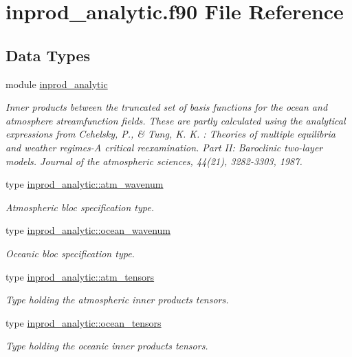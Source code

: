 \hypertarget{inprod__analytic_8f90}{\section{inprod\-\_\-analytic.\-f90 File Reference}
\label{inprod__analytic_8f90}
}
\subsection*{Data Types}
\begin{DoxyCompactItemize}
\item 
module \hyperlink{classinprod__analytic}{inprod\-\_\-analytic}
\begin{DoxyCompactList}\small\item\em Inner products between the truncated set of basis functions for the ocean and atmosphere streamfunction fields. These are partly calculated using the analytical expressions from Cehelsky, P., \& Tung, K. K. \-: Theories of multiple equilibria and weather regimes-\/\-A critical reexamination. Part I\-I\-: Baroclinic two-\/layer models. Journal of the atmospheric sciences, 44(21), 3282-\/3303, 1987. \end{DoxyCompactList}\item 
type \hyperlink{structinprod__analytic_1_1atm__wavenum}{inprod\-\_\-analytic\-::atm\-\_\-wavenum}
\begin{DoxyCompactList}\small\item\em Atmospheric bloc specification type. \end{DoxyCompactList}\item 
type \hyperlink{structinprod__analytic_1_1ocean__wavenum}{inprod\-\_\-analytic\-::ocean\-\_\-wavenum}
\begin{DoxyCompactList}\small\item\em Oceanic bloc specification type. \end{DoxyCompactList}\item 
type \hyperlink{structinprod__analytic_1_1atm__tensors}{inprod\-\_\-analytic\-::atm\-\_\-tensors}
\begin{DoxyCompactList}\small\item\em Type holding the atmospheric inner products tensors. \end{DoxyCompactList}\item 
type \hyperlink{structinprod__analytic_1_1ocean__tensors}{inprod\-\_\-analytic\-::ocean\-\_\-tensors}
\begin{DoxyCompactList}\small\item\em Type holding the oceanic inner products tensors. \end{DoxyCompactList}\end{DoxyCompactItemize}
